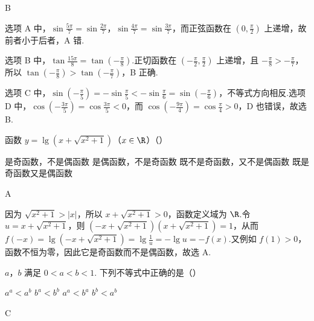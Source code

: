 \begin{answer}
B
\end{answer}

\begin{solution}
选项 A 中，\(\sin\frac{5\pi}{7}=\sin\frac{2\pi}{7}\)，\(\sin\frac{4\pi}{7}=\sin\frac{3\pi}{7}\)，而正弦函数在 \((0,\frac{\pi}{2})\) 上递增，故前者小于后者，A 错.

选项 B 中，\(\tan\frac{15\pi}{8}=\tan\left(-\frac{\pi}{8}\right)\).正切函数在 \((-\frac{\pi}{2},\frac{\pi}{2})\) 上递增，且 \(-\frac{\pi}{8}>-\frac{\pi}{7}\)，所以
\(\tan\left(-\frac{\pi}{8}\right)>\tan\left(-\frac{\pi}{7}\right)\)，B 正确.

选项 C 中，\(\sin\left(-\frac{\pi}{5}\right)=-\sin\frac{\pi}{5}<-\sin\frac{\pi}{6}=\sin\left(-\frac{\pi}{6}\right)\)，不等式方向相反.选项 D 中，\(\cos\left(-\frac{3\pi}{5}\right)=\cos\frac{3\pi}{5}<0\)，而 \(\cos\left(-\frac{9\pi}{4}\right)=\cos\frac{\pi}{4}>0\)，D 也错误，故选 B.
\end{solution}

\begin{problem}

函数 \(y=\lg \left( x+\sqrt{x^2+1} \right)\)（\(x\in\R\)）（\quad）

\choices
    {是奇函数，不是偶函数}
    {是偶函数，不是奇函数}
    {既不是奇函数，又不是偶函数}
    {既是奇函数又是偶函数}
\end{problem}

\begin{answer}
A
\end{answer}

\begin{solution}
因为 \(\sqrt{x^2+1}>|x|\)，所以 \(x+\sqrt{x^2+1}>0\)，函数定义域为 \(\R\).令
\(u=x+\sqrt{x^2+1}\)，则
\(\left(-x+\sqrt{x^2+1}\right)\left(x+\sqrt{x^2+1}\right)=1\)，从而
\(f(-x)=\lg\left(-x+\sqrt{x^2+1}\right)=\lg\frac{1}{u}=-\lg u=-f(x)\).又例如 \(f(1)>0\)，函数不恒为零，因此它是奇函数而不是偶函数，故选 A.
\end{solution}

\begin{problem}

\(a\)，\(b\) 满足 \(0<a<b<1\). 下列不等式中正确的是（\quad）

\choices
    {\(a^a<a^b\)}
    {\(b^a<b^b\)}
    {\(a^a<b^a\)}
    {\(b^b<a^b\)}
\end{problem}

\begin{answer}
C
\end{answer}


